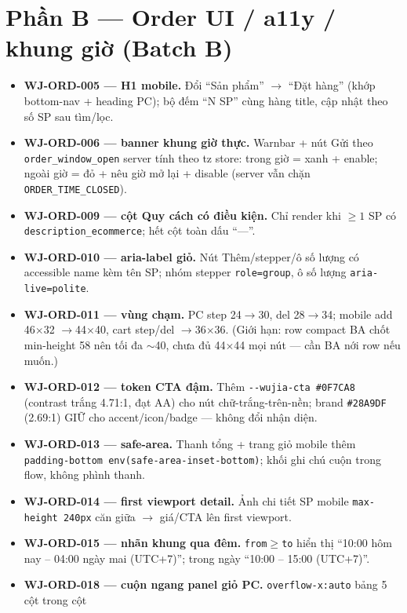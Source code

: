 \section{Phần B --- Order UI / a11y / khung giờ (Batch B)}

\begin{itemize}
  \item \textbf{WJ-ORD-005 --- H1 mobile.} Đổi ``Sản phẩm'' $\to$ ``Đặt hàng'' (khớp bottom-nav +
    heading PC); bộ đếm ``N SP'' cùng hàng title, cập nhật theo số SP sau tìm/lọc.
  \item \textbf{WJ-ORD-006 --- banner khung giờ thực.} Warnbar + nút Gửi theo \texttt{order\_window\_open}
    server tính theo tz store: trong giờ = xanh + enable; ngoài giờ = đỏ + nêu giờ mở lại + disable
    (server vẫn chặn \texttt{ORDER\_TIME\_CLOSED}).
  \item \textbf{WJ-ORD-009 --- cột Quy cách có điều kiện.} Chỉ render khi $\geq 1$ SP có
    \texttt{description\_ecommerce}; hết cột toàn dấu ``---''.
  \item \textbf{WJ-ORD-010 --- aria-label giỏ.} Nút Thêm/stepper/ô số lượng có accessible name kèm tên SP;
    nhóm stepper \texttt{role=group}, ô số lượng \texttt{aria-live=polite}.
  \item \textbf{WJ-ORD-011 --- vùng chạm.} PC step 24$\to$30, del 28$\to$34; mobile add 46$\times$32
    $\to$44$\times$40, cart step/del $\to$36$\times$36. (Giới hạn: row compact BA chốt min-height 58
    nên tối đa $\sim$40, chưa đủ 44$\times$44 mọi nút --- cần BA nới row nếu muốn.)
  \item \textbf{WJ-ORD-012 --- token CTA đậm.} Thêm \texttt{-{}-wujia-cta \#0F7CA8} (contrast trắng
    4.71:1, đạt AA) cho nút chữ-trắng-trên-nền; brand \texttt{\#28A9DF} (2.69:1) GIỮ cho
    accent/icon/badge --- không đổi nhận diện.
  \item \textbf{WJ-ORD-013 --- safe-area.} Thanh tổng + trang giỏ mobile thêm
    \texttt{padding-bottom env(safe-area-inset-bottom)}; khối ghi chú cuộn trong flow, không phình thanh.
  \item \textbf{WJ-ORD-014 --- first viewport detail.} Ảnh chi tiết SP mobile \texttt{max-height 240px}
    căn giữa $\to$ giá/CTA lên first viewport.
  \item \textbf{WJ-ORD-015 --- nhãn khung qua đêm.} \texttt{from$\geq$to} hiển thị
    ``10:00 hôm nay -- 04:00 ngày mai (UTC+7)''; trong ngày ``10:00 -- 15:00 (UTC+7)''.
  \item \textbf{WJ-ORD-018 --- cuộn ngang panel giỏ PC.} \texttt{overflow-x:auto} bảng 5 cột trong cột

\end{itemize}
